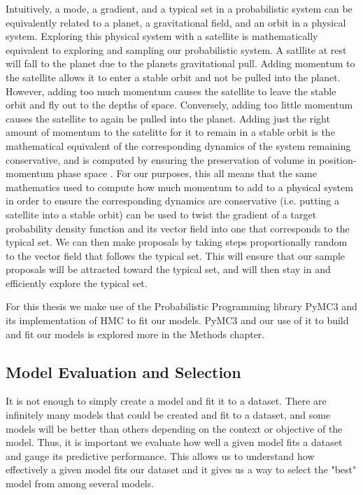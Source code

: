 Intuitively, a mode, a gradient, and a typical set in a probabilistic system can be equivalently related to a planet, a gravitational field, and an orbit in a physical system. Exploring this physical system with a satellite is mathematically equivalent to exploring and sampling our probabilistic system. A satllite at rest will fall to the planet due to the planets gravitational pull. Adding momentum to the satellite allows it to enter a stable orbit and not be pulled into the planet. However, adding too much momentum causes the satellite to leave the stable orbit and fly out to the depths of space. Conversely, adding too little momentum causes the satellite to again be pulled into the planet. Adding just the right amount of momentum to the satelitte for it to remain in a stable orbit is the mathematical equivalent of the corresponding dynamics of the system remaining conservative, and is computed by ensuring the preservation of volume in position-momentum phase space \cite{Betancourt2017}. For our purposes, this all means that the same mathematics used to compute how much momentum to add to a physical system in order to ensure the corresponding dynamics are conservative (i.e. putting a satellite into a stable orbit) can be used to twist the gradient of a target probability density function and its vector field into one that corresponds to the typical set. We can then make proposals by taking steps proportionally random to the vector field that follows the typical set. This will ensure that our sample proposals will be attracted toward the typical set, and will then stay in and efficiently explore the typical set.

For this thesis we make use of the Probabilistic Programming library PyMC3 \cite{pymc3} and its implementation of HMC to fit our models. PyMC3 and our use of it to build and fit our models is explored more in the Methods chapter.

\subsection{Model Evaluation and Selection}

It is not enough to simply create a model and fit it to a dataset. There are infinitely many models that could be created and fit to a dataset, and some models will be better than others depending on the context or objective of the model. Thus, it is important we evaluate how well a given model fits a dataset and gauge its predictive performance. This allows us to understand how effectively a given model fits our dataset and it gives us a way to select the "best" model from among several models.

